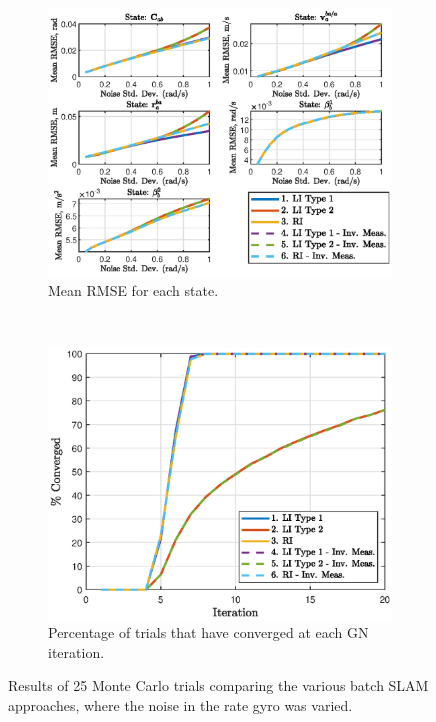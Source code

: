 \begin{figure}
	\centering
	\begin{subfigure}[b]{0.5\textwidth}
		\includegraphics[width=\textwidth]{figs/batch/gyro_rmse.eps}
		\caption{Mean RMSE for each state.}
	\end{subfigure}
	~
	\begin{subfigure}[b]{0.5\textwidth}
		\includegraphics[width=\textwidth]{figs/batch/gyro_perc.eps}
		\caption{Percentage of trials that have converged at each GN iteration.}
	\end{subfigure}
	\caption[Results comparing batch SLAM approaches varying rate gyro noise.]{Results of 25 Monte Carlo trials comparing the various batch SLAM approaches, where the noise in the rate gyro was varied.}
	\label{fig:batch_gyro}
\end{figure}

